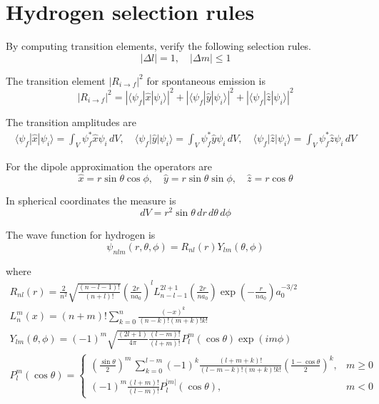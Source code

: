 

\section*{Hydrogen selection rules}

By computing transition elements, verify the following selection rules.
\begin{equation*}
|\Delta l|=1,\quad|\Delta m|\le1
\end{equation*}

The transition element $|R_{i\rightarrow f}|^2$ for spontaneous emission is
\begin{equation*}
|R_{i\rightarrow f}|^2
=|\langle\psi_f|\hat x|\psi_i\rangle|^2
+|\langle\psi_f|\hat y|\psi_i\rangle|^2
+|\langle\psi_f|\hat z|\psi_i\rangle|^2
\end{equation*}

The transition amplitudes are
\begin{gather*}
\langle\psi_f|\hat x|\psi_i\rangle
=\int_V\psi_f^*\hat x\psi_i\,dV,
\quad
\langle\psi_f|\hat y|\psi_i\rangle
=\int_V\psi_f^*\hat y\psi_i\,dV,
\quad
\langle\psi_f|\hat z|\psi_i\rangle
=\int_V\psi_f^*\hat z\psi_i\,dV
\end{gather*}

For the dipole approximation the operators are
\begin{equation*}
\hat x=r\sin\theta\cos\phi,
\quad
\hat y=r\sin\theta\sin\phi,
\quad
\hat z=r\cos\theta
\end{equation*}

In spherical coordinates the measure is
\begin{equation*}
dV=r^2\sin\theta\,dr\,d\theta\,d\phi
\end{equation*}

The wave function for hydrogen is
\begin{equation*}
\psi_{nlm}(r,\theta,\phi)=R_{nl}(r)Y_{lm}(\theta,\phi)
\end{equation*}

where
\begin{gather*}
R_{nl}(r)=
\frac{2}{n^2}
\sqrt{\frac{(n-l-1)!}{(n+l)!}}
\left(\frac{2r}{na_0}\right)^l
L_{n-l-1}^{2l+1}\left(\frac{2r}{na_0}\right)
\exp\left(-\frac{r}{na_0}\right)
a_0^{-3/2}
\\[1ex]
L_n^m(x)=(n+m)!\sum_{k=0}^n\frac{(-x)^k}{(n-k)!(m+k)!k!}
\\[1ex]
Y_{lm}(\theta,\phi)=(-1)^m
\sqrt{\frac{(2l+1)}{4\pi}
\frac{(l-m)!}{(l+m)!}}
P_l^m(\cos\theta)\exp(im\phi)
\\[1ex]
P_l^m(\cos\theta)=\begin{cases}
\displaystyle
\left(\frac{\sin\theta}{2}\right)^m\,\sum_{k=0}^{l-m}
(-1)^k\frac{(l+m+k)!}{(l-m-k)!(m+k)!k!}
\left(\frac{1-\cos\theta}{2}\right)^k, & m\ge0
\\[3ex]
\displaystyle
(-1)^m\frac{(l+m)!}{(l-m)!}P_l^{|m|}(\cos\theta), & m<0
\end{cases}
\end{gather*}


